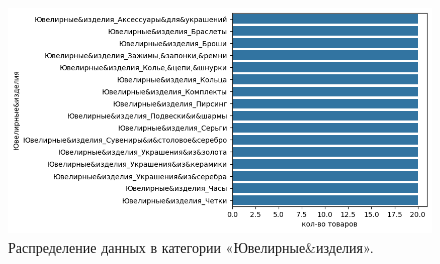\documentclass[a4paper,12pt]{extarticle}
\begin{document}
\begin{figure}[hbtp]
	\centering
	\includegraphics[scale=0.8]{приложения/amount_of_category_Ювелирные&изделия.png}
	\caption{Распределение данных в категории «Ювелирные\&изделия».}
	\label{fig:amount_of_category_Ювелирные&изделия}
\end{figure}
\end{document}
